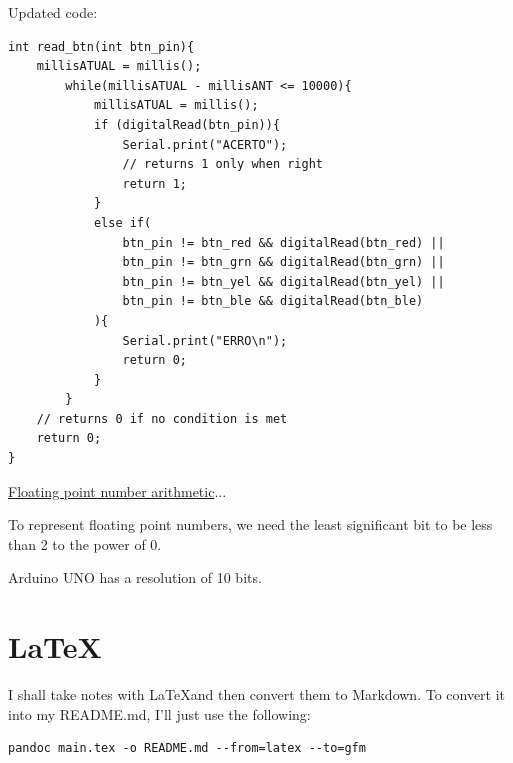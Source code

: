 \documentclass{article}
\begin{document}
Updated code:
\begin{verbatim}
int read_btn(int btn_pin){
    millisATUAL = millis();
        while(millisATUAL - millisANT <= 10000){
            millisATUAL = millis();
            if (digitalRead(btn_pin)){
                Serial.print("ACERTO");
                // returns 1 only when right
                return 1;
            }
            else if(
                btn_pin != btn_red && digitalRead(btn_red) ||
                btn_pin != btn_grn && digitalRead(btn_grn) ||
                btn_pin != btn_yel && digitalRead(btn_yel) ||
                btn_pin != btn_ble && digitalRead(btn_ble)
            ){
                Serial.print("ERRO\n");
                return 0;
            }
        }
    // returns 0 if no condition is met    
    return 0;
}
\end{verbatim}

\href{https://en.wikipedia.org/wiki/IEEE_754}{Floating point number arithmetic}...

To represent floating point numbers, we need the least significant bit to be less than 2 to the power of 0.

Arduino UNO has a resolution of 10 bits. 

\section{\LaTeX}
I shall take notes with \LaTeX and then convert them to Markdown. To convert it into my README.md, I’ll just use the following:

\begin{verbatim}
pandoc main.tex -o README.md --from=latex --to=gfm
\end{verbatim}



\end{document}
